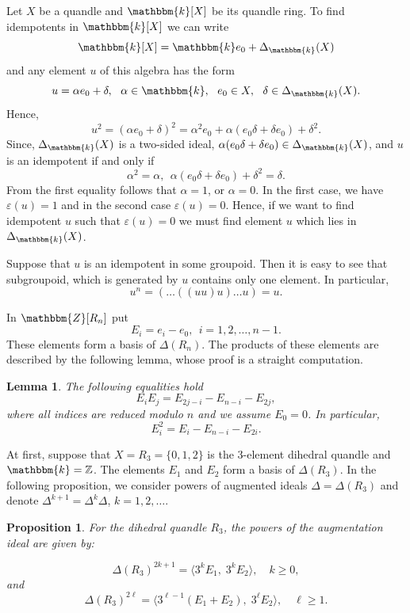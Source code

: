 \documentclass[12pt]{amsart}
\newtheorem{pro}[thm]{Proposition}
\newtheorem{lemma}[thm]{Lemma}
\theoremstyle{definition}
\theoremstyle{remark}
\newcommand{\Z}{\mathbb{Z}}
\begin{document}
Let $X$ be a quandle and $\mathbbm {k}[X]$ be its quandle ring. To find idempotents in $\mathbbm {k}[X]$ we can write 
$$
\mathbbm {k}[X] = \mathbbm {k} e_0 + \Delta_{\mathbbm {k}}(X)
$$
and any element $u$ of this algebra has the form
$$
u = \alpha e_0 + \delta,~~\alpha \in \mathbbm {k},~~e_0 \in X,~~\delta \in \Delta_{\mathbbm {k}}(X).
$$
Hence,
$$
u^2 = (\alpha e_0 + \delta)^2 = \alpha^2  e_0 + \alpha (e_0 \delta +  \delta e_0) + \delta^2.
$$
Since, $\Delta_{\mathbbm {k}}(X)$ is a two-sided ideal, $ \alpha (e_0 \delta +  \delta e_0) \in \Delta_{\mathbbm {k}}(X)$, and $u$ is an idempotent if and only if
$$
 \alpha^2  =  \alpha, ~~\alpha (e_0 \delta +  \delta e_0) + \delta^2 =   \delta.
$$
From the first equality follows that $ \alpha = 1$, or $ \alpha = 0$. In the first case, we have $\varepsilon(u) = 1$ and in the second case $\varepsilon(u) = 0$. Hence, if we want to find idempotent $u$ such that $\varepsilon(u) = 0$ we must find element $u$ which lies in  $\Delta_{\mathbbm {k}}(X)$.



Suppose that $u$ is an idempotent in some groupoid. Then it is easy to see that subgroupoid, which is generated by $u$ contains only one element. In particular,
$$
u^n = (\ldots((uu)u)\ldots u) = u.
$$ 

In $\mathbbm {Z}[R_n]$ put
$$
E_i = e_i - e_0,~~i = 1, 2, \ldots, n-1.
$$
These elements form a basis of $\Delta(R_n)$. The products of these elements are described by the following lemma, whose proof is a straight computation.

\begin{lemma} \label{E}
The following equalities hold
$$
E_i E_j = E_{2j-i} - E_{n-i} - E_{2j},
$$
where all indices are reduced modulo $n$ and we assume $E_0 = 0$. In particular,
$$
E_i^2= E_{i} - E_{n-i} - E_{2i}.
$$
\end{lemma}




At first, suppose that $X = R_3 = \{ 0, 1, 2 \}$ is the 3-element  dihedral quandle and $\mathbbm {k} = \Z$. The elements $E_1$ and $E_2$  form a basis of $\Delta(R_3)$.
In the following proposition, we  consider powers of augmented ideals $\Delta = \Delta(R_3)$ and denote $\Delta^{k+1} = \Delta^k \Delta$, $k = 1, 2, \ldots$.

\begin{pro}\label{pro4.8}
For the dihedral quandle $R_3$, the powers of the augmentation ideal are given by:%

\[
\Delta(R_3)^{2k+1}
= \langle 3^k E_1,\; 3^k E_2 \rangle,
\quad k \ge 0,
\]
and
\[
\Delta(R_3)^{2\ell}
= \langle 3^{\ell-1}(E_1+E_2),\; 3^\ell E_2 \rangle,
\quad \ell \ge 1.
\]
 



\end{pro}
\end{document}
